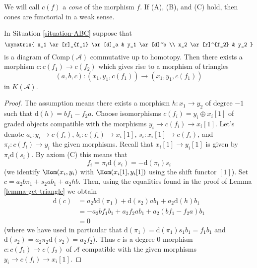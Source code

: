 \noindent
We will call $c(f)$ a {\it cone} of the morphism $f$.
If (A), (B), and (C) hold, then
cones are functorial in a weak sense.

\begin{lemma}
\label{lemma-cone}
In Situation \ref{situation-ABC} suppose that
$$
\xymatrix{
x_1 \ar[r]_{f_1} \ar[d]_a & y_1 \ar[d]^b \\
x_2 \ar[r]^{f_2} & y_2
}
$$
is a diagram of $\text{Comp}(\mathcal{A})$ commutative up to homotopy.
Then there exists a morphism $c : c(f_1) \to c(f_2)$ which gives rise to
a morphism of triangles
$$
(a, b, c) : (x_1, y_1, c(f_1)) \to (x_1, y_1, c(f_1))
$$
in $K(\mathcal{A})$.
\end{lemma}

\begin{proof}
The assumption means there exists a morphism $h : x_1 \to y_2$ of degree
$-1$ such that $\text{d}(h) = b f_1 - f_2 a$. Choose isomorphisms
$c(f_i) = y_i \oplus x_i[1]$ of graded objects compatible with the
morphisms $y_i \to c(f_i) \to x_i[1]$. Let's denote
$a_i : y_i \to c(f_i)$, $b_i : c(f_i) \to x_i[1]$, $s_i : x_i[1] \to c(f_i)$,
and $\pi_i : c(f_i) \to y_i$ the given morphisms. Recall that
$x_i[1] \to y_i[1]$ is given by $\pi_i \text{d}(s_i)$. By axiom (C)
this means that
$$
f_i = \pi_i \text{d}(s_i) = - \text{d}(\pi_i) s_i
$$
(we identify $\Hom(x_i, y_i)$ with $\Hom(x_i[1], y_i[1])$
using the shift functor $[1]$).
Set $c = a_2 b \pi_1 + s_2 a b_1 + a_2hb$. Then, using the
equalities found in the proof of Lemma \ref{lemma-get-triangle}
we obtain
\begin{align*}
\text{d}(c)
& =
a_2 b \text{d}(\pi_1) + \text{d}(s_2) a b_1 + a_2 \text{d}(h) b_1 \\
& =
- a_2 b f_1 b_1 + a_2 f_2 a b_1 + a_2 (b f_1 - f_2 a) b_1 \\
& = 0
\end{align*}
(where we have used in particular that
$\text{d}(\pi_1) = \text{d}(\pi_1) s_1 b_1 = f_1 b_1$ and
$\text{d}(s_2) = a_2 \pi_2 \text{d}(s_2) = a_2 f_2$).
Thus $c$ is a degree $0$ morphism $c : c(f_1) \to c(f_2)$ of $\mathcal{A}$
compatible with the given morphisms $y_i \to c(f_i) \to x_i[1]$.
\end{proof}

